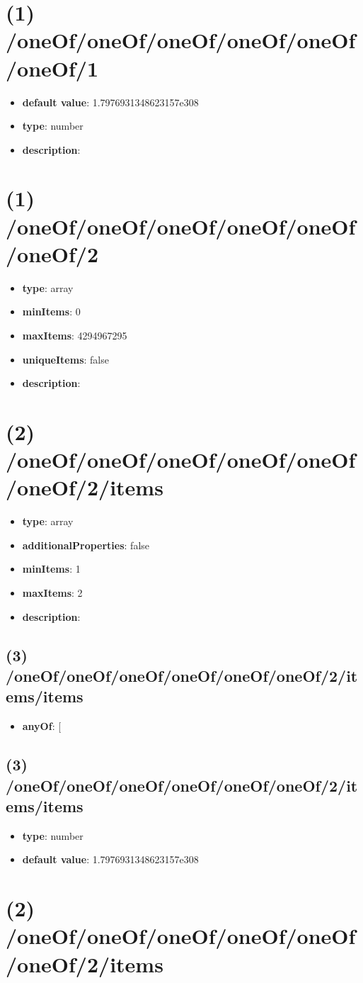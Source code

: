 \section{(1) /oneOf/oneOf/oneOf/oneOf/oneOf/oneOf/1}
\begin{itemize}[leftmargin=1em]\item {\bf default value}: 1.7976931348623157e308
\item {\bf type}: number
\item {\bf description}: 
\end{itemize}\section{(1) /oneOf/oneOf/oneOf/oneOf/oneOf/oneOf/2}
\begin{itemize}[leftmargin=1em]\item {\bf type}: array
\item {\bf minItems}: 0
\item {\bf maxItems}: 4294967295
\item {\bf uniqueItems}: false
\item {\bf description}: 
\end{itemize}\section{(2) /oneOf/oneOf/oneOf/oneOf/oneOf/oneOf/2/items}
\begin{itemize}[leftmargin=2em]\item {\bf type}: array
\item {\bf additionalProperties}: false
\item {\bf minItems}: 1
\item {\bf maxItems}: 2
\item {\bf description}: 
\end{itemize}\subsection{(3) /oneOf/oneOf/oneOf/oneOf/oneOf/oneOf/2/items/items}
\begin{itemize}[leftmargin=3em]\item {\bf anyOf}: [\end{itemize}\subsection{(3) /oneOf/oneOf/oneOf/oneOf/oneOf/oneOf/2/items/items}
\begin{itemize}[leftmargin=3em]\item {\bf type}: number\item {\bf default value}: 1.7976931348623157e308
\end{itemize}\section{(2) /oneOf/oneOf/oneOf/oneOf/oneOf/oneOf/2/items}
